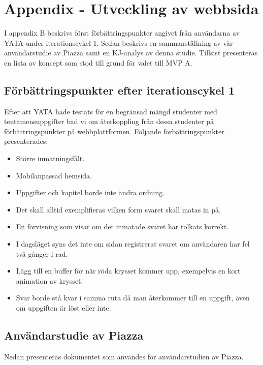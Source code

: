 \chapter{Appendix - Utveckling av webbsida}
\label{app:B}
I appendix B beskrivs först förbättringspunkter angivet från användarna av YATA under iterationscykel 1. Sedan beskrivs en sammanställning av vår användarstudie av Piazza samt en KJ-analys av denna studie. Tillsist presenteras en lista av koncept som stod till grund för valet till MVP A. 

\section{Förbättringspunkter efter iterationscykel 1}
\label{app:itt}

Efter att YATA hade testats för en begränsad mängd studenter med tentamensuppgifter bad vi om återkoppling från dessa studenter på förbättringspunkter på webbplattformen. Följande förbättringspunkter presenterades:

\begin{itemize}
    \item Större inmatningsfält.
    \item Mobilanpassad hemsida. 
    \item Uppgifter och kapitel borde inte ändra ordning. 
    \item Det skall alltid exemplifieras vilken form svaret skall matas in på. 
    \item En förvisning som visar om det inmatade svaret har tolkats korrekt. 
    \item I dagsläget syns det inte om sidan registrerat svaret om användaren har fel två gånger i rad. 
    \item Lägg till en buffer för när röda krysset kommer upp, exempelvis en kort animation av krysset.
    \item Svar borde stå kvar i samma ruta då man återkommer till en uppgift, även om uppgiften är löst eller inte. 
\end{itemize}

\newpage

\section{Användarstudie av Piazza}
\label{app:surveypiazza}
Nedan presenteras dokumentet som användes för användarstudien av Piazza. 


